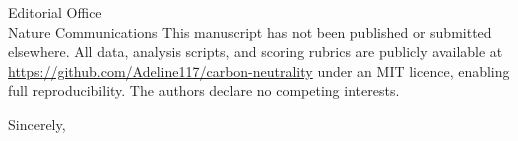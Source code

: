 \documentclass[11pt]{letter}
\begin{document}
\begin{letter}{Editorial Office\\Nature Communications}
This manuscript has not been published or submitted elsewhere. All data, analysis scripts, and scoring rubrics are publicly available at \url{https://github.com/Adeline117/carbon-neutrality} under an MIT licence, enabling full reproducibility. The authors declare no competing interests.

\closing{Sincerely,}

\end{letter}
\end{document}
